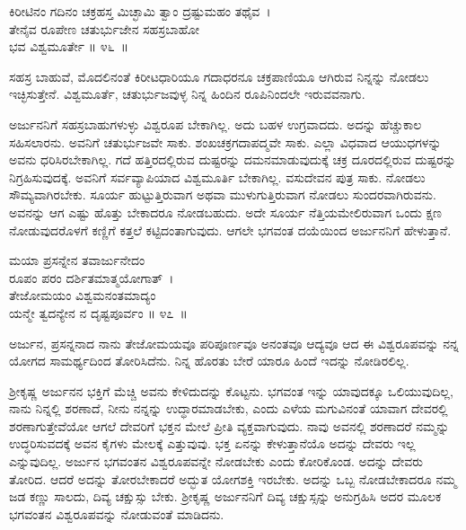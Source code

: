 \begin{shloka}
ಕಿರೀಟಿನಂ ಗದಿನಂ ಚಕ್ರಹಸ್ತ ಮಿಚ್ಛಾಮಿ ತ್ವಾಂ ದ್ರಷ್ಟುಮಹಂ ತಥೈವ~।\\ತೇನೈವ ರೂಪೇಣ ಚತುರ್ಭುಜೇನ ಸಹಸ್ರಬಾಹೋ\\ ಭವ ವಿಶ್ವಮೂರ್ತೇ \hfill॥ ೪೬~॥
\end{shloka}

\begin{artha}
ಸಹಸ್ರ ಬಾಹುವೆ, ಮೊದಲಿನಂತೆ ಕಿರೀಟಧಾರಿಯೂ ಗದಾಧರನೂ ಚಕ್ರಪಾಣಿಯೂ ಆಗಿರುವ ನಿನ್ನನ್ನು ನೋಡಲು ಇಚ್ಛಿಸುತ್ತೇನೆ. ವಿಶ್ವಮೂರ್ತೆ, ಚತುರ್ಭುಜವುಳ್ಳ ನಿನ್ನ ಹಿಂದಿನ ರೂಪಿನಿಂದಲೇ ಇರುವವನಾಗು.
\end{artha}

ಅರ್ಜುನನಿಗೆ ಸಹಸ್ರಬಾಹುಗಳುಳ್ಳು ವಿಶ್ವರೂಪ ಬೇಕಾಗಿಲ್ಲ. ಅದು ಬಹಳ ಉಗ್ರವಾದದು. ಅದನ್ನು ಹೆಚ್ಚುಕಾಲ ಸಹಿಸಲಾರನು. ಅವನಿಗೆ ಚತುರ್ಭುಜವೇ ಸಾಕು. ಶಂಖಚಕ್ರಗದಾಪದ್ಮವೇ ಸಾಕು. ಎಲ್ಲಾ ವಿಧವಾದ ಆಯುಧಗಳನ್ನು ಅವನು ಧರಿಸಿರಬೇಕಾಗಿಲ್ಲ. ಗದೆ ಹತ್ತಿರದಲ್ಲಿರುವ ದುಷ್ಟರನ್ನು ದಮನಮಾಡುವುದುಕ್ಕೆ ಚಕ್ರ ದೂರದಲ್ಲಿರುವ ದುಷ್ಟರನ್ನು ನಿಗ್ರಹಿಸುವುದಕ್ಕೆ. ಅವನಿಗೆ ಸರ್ವವ್ಯಾಪಿಯಾದ ವಿಶ್ವಮೂರ್ತಿ ಬೇಕಾಗಿಲ್ಲ. ವಸುದೇವನ ಪುತ್ರ ಸಾಕು. ನೋಡಲು ಸೌಮ್ಯವಾಗಿರಬೇಕು. ಸೂರ್ಯ ಹುಟ್ಟುತ್ತಿರುವಾಗ ಅಥವಾ ಮುಳುಗುತ್ತಿರುವಾಗ ನೋಡಲು ಸುಂದರವಾಗಿರುವನು. ಅವನನ್ನು ಆಗ ಎಷ್ಟು ಹೊತ್ತು ಬೇಕಾದರೂ ನೋಡಬಹುದು. ಅದೇ ಸೂರ್ಯ ನೆತ್ತಿಯಮೇಲಿರುವಾಗ ಒಂದು ಕ್ಷಣ ನೋಡುವುದರೊಳಗೆ ಕಣ್ಣಿಗೆ ಕತ್ತಲೆ ಕಟ್ಟಿದಂತಾಗುವುದು. ಆಗಲೇ ಭಗವಂತ ದಯೆಯಿಂದ ಅರ್ಜುನನಿಗೆ ಹೇಳುತ್ತಾನೆ.

\begin{shloka}
ಮಯಾ ಪ್ರಸನ್ನೇನ ತವಾರ್ಜುನೇದಂ \\ ರೂಪಂ ಪರಂ ದರ್ಶಿತಮಾತ್ಮಯೋಗಾತ್~।\\ತೇಜೋಮಯಂ ವಿಶ್ವಮನಂತಮಾದ್ಯಂ \\ ಯನ್ಮೇ ತ್ವದನ್ಯೇನ ನ ದೃಷ್ಟಪೂರ್ವಂ \hfill॥ ೪೭~॥
\end{shloka}

\begin{artha}
ಅರ್ಜುನ, ಪ್ರಸನ್ನನಾದ ನಾನು ತೇಜೋಮಯವೂ ಪರಿಪೂರ್ಣವೂ ಅನಂತವೂ ಆದ್ಯವೂ ಆದ ಈ ವಿಶ್ವರೂಪವನ್ನು ನನ್ನ ಯೋಗದ ಸಾಮರ್ಥ್ಯದಿಂದ ತೋರಿಸಿದೆನು. ನಿನ್ನ ಹೊರತು ಬೇರೆ ಯಾರೂ ಹಿಂದೆ ಇದನ್ನು ನೋಡಿರಲಿಲ್ಲ.
\end{artha}

ಶ‍್ರೀಕೃಷ್ಣ ಅರ್ಜುನನ ಭಕ್ತಿಗೆ ಮೆಚ್ಚಿ ಅವನು ಕೇಳಿದುದನ್ನು ಕೊಟ್ಟನು. ಭಗವಂತ ಇನ್ನು ಯಾವುದಕ್ಕೂ ಒಲಿಯುವುದಿಲ್ಲ, ನಾನು ನಿನ್ನಲ್ಲಿ ಶರಣಾದೆ, ನೀನು ನನ್ನನ್ನು ಉದ್ಧಾರಮಾಡಬೇಕು, ಎಂದು ಎಳೆಯ ಮಗುವಿನಂತೆ ಯಾವಾಗ ದೇವರಲ್ಲಿ ಶರಣಾಗುತ್ತೇವೆಯೋ ಆಗಲೆ ದೇವರಿಗೆ ಭಕ್ತನ ಮೇಲೆ ಪ್ರೀತಿ ವ್ಯಕ್ತವಾಗುವುದು. ನಾವು ಅವನಲ್ಲಿ ಶರಣಾದರೆ ನಮ್ಮನ್ನು ಉದ್ಧರಿಸುವದಕ್ಕೆ ಅವನ ಕೈಗಳು ಮೇಲಕ್ಕೆ ಎತ್ತುವುವು. ಭಕ್ತ ಏನನ್ನು ಕೇಳುತ್ತಾನೆಯೊ ಅದನ್ನು ದೇವರು ಇಲ್ಲ ಎನ್ನುವುದಿಲ್ಲ. ಅರ್ಜುನ ಭಗವಂತನ ವಿಶ್ವರೂಪವನ್ನೇ ನೋಡಬೇಕು ಎಂದು ಕೋರಿಕೊಂಡ. ಅದನ್ನು ದೇವರು ತೋರಿದ. ಆದರೆ ಅದನ್ನು ತೋರಬೇಕಾದರೆ ಅದ್ಭುತ ಯೋಗಶಕ್ತಿ ಇರಬೇಕು. ಅದನ್ನು ಒಬ್ಬ ನೋಡಬೇಕಾದರೂ ನಮ್ಮ ಜಡ ಕಣ್ಣು ಸಾಲದು, ದಿವ್ಯ ಚಕ್ಷುಸ್ಸು ಬೇಕು. ಶ‍್ರೀಕೃಷ್ಣ ಅರ್ಜುನನಿಗೆ ದಿವ್ಯ ಚಕ್ಷುಸ್ಸನ್ನು ಅನುಗ್ರಹಿಸಿ ಅದರ ಮೂಲಕ ಭಗವಂತನ ವಿಶ್ವರೂಪವನ್ನು ನೋಡುವಂತೆ ಮಾಡಿದನು.


